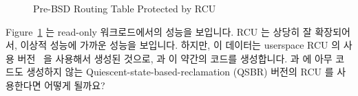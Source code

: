 \begin{figure}[tb]
\centering
{}
\caption{Pre-BSD Routing Table Protected by RCU}
\label{fig:defer:Pre-BSD Routing Table Protected by RCU}
\end{figure}

Figure~\ref{fig:defer:Pre-BSD Routing Table Protected by RCU}
는 read-only 워크로드에서의 성능을 보입니다.
RCU 는 상당히 잘 확장되어서, 이상적 성능에 가까운 성능을 보입니다.
하지만, 이 데이터는 userspace RCU 의  사용
버전~\cite{MathieuDesnoyers2009URCU,PaulMcKenney2013LWNURCU} 을 사용해서 생성된
것으로,  과  이 약간의 코드를
생성합니다.
 과  에 아무 코드도 생성하지 않는
Quiescent-state-based-reclamation (QSBR) 버전의 RCU 를 사용한다면 어떻게
될까요?

